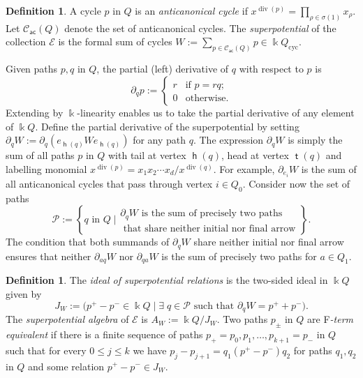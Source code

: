 \documentclass[11pt,a4paper]{amsart}
\numberwithin{equation}{section}
\theoremstyle{definition}
\newtheorem{definition}[theorem]{Definition}
\theoremstyle{remark}
\newcommand{\kk}{\ensuremath{\Bbbk}}
\renewcommand{\div}{\operatorname{div}}
\newcommand{\head}{\operatorname{\mathsf{h}}}
\newcommand{\tail}{\operatorname{\mathsf{t}}}
\newcommand{\ACcyc}{\ensuremath{\mathscr{C}_{\mathsf{ac}}(Q)}}
\begin{document}
\begin{definition}
\label{defn:superpotentialnosigns}
A cycle $p$ in $Q$ is an \emph{anticanonical cycle} if $x^{\div(p)}=\prod_{\rho\in \sigma(1)} x_\rho$. Let $\ACcyc$ denote the set of anticanonical cycles. The \emph{superpotential} of the collection $\mathscr{E}$ is the formal sum of cycles $W := \sum_{p\in \ACcyc} p\in \kk Q_{\mathrm{cyc}}$. \end{definition}

Given paths $p,q$ in $Q$, the partial (left) derivative of $q$ with respect to $p$ is
\[
\partial_qp:=\left\{\begin{array}{cl} r & \text{if }p=rq; \\ 0 & \text{otherwise.}\end{array}\right.
\]
Extending by $\kk$-linearity enables us to take the partial derivative of any element of $\kk Q$. Define the partial derivative of the superpotential by setting $\partial_qW:= \partial_q(e_{\head(q)}W e_{\head(q)})$ for any path $q$. The expression $\partial_q W$ is simply the sum of all paths $p$ in $Q$ with tail at vertex $\head(q)$,  head at vertex $\tail(q)$ and labelling monomial $x^{\div(p)} = x_1x_2\cdots x_{d}/x^{\div(q)}$. For example,  $\partial_{e_i}W$ is the sum of all anticanonical cycles that pass through vertex $i\in Q_0$. Consider now the set of paths
\[
\mathscr{P}:= \left\{ q \text{ in }Q \; \bigg| \begin{array}{c} \partial_q W \text{ is the sum of precisely two paths} \\ \text{ that share neither initial nor final arrow}\end{array} \right\}.
\]
The condition that both summands of $\partial_q W$  share neither initial nor final arrow ensures that neither $\partial_{aq} W$ nor $\partial_{qa} W$ is the sum of precisely two paths for $a\in Q_1$.


\begin{definition}
\label{def:Ftermequiv}
The \emph{ideal of superpotential relations} is the two-sided ideal in $\kk Q$ given by
\[
J_{W}:= \big( p^+-p^-\in \kk Q \mid \exists\; q\in \mathscr{P} \text{ such that }\partial_qW = p^++p^-\big).
\] 
The \emph{superpotential algebra} of $\mathscr{E}$ is $A_{W}:= \kk Q/J_{W}$. Two paths $p_\pm$ in $Q$ are F\emph{-term equivalent} if there is a finite sequence of paths $p_+=p_0, p_1, \dots, p_{k+1}=p_-$ in $Q$ such that for every $0\leq j\leq k$ we have $p_j- p_{j+1}=q_1(p^+-p^-)q_2$ for paths $q_1, q_2$ in $Q$ and some relation $p^+-p^-\in J_W$. 
\end{definition}
\end{document}
